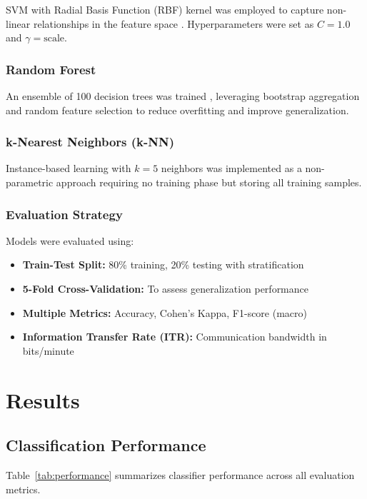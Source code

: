 \documentclass[11pt]{article}
\begin{document}
SVM with Radial Basis Function (RBF) kernel was employed to capture non-linear relationships in the feature space \citep{lotte2018review,pedregosa2011scikit}. Hyperparameters were set as $C=1.0$ and $\gamma=\text{scale}$.

\subsubsection{Random Forest}

An ensemble of 100 decision trees was trained \citep{pedregosa2011scikit}, leveraging bootstrap aggregation and random feature selection to reduce overfitting and improve generalization.

\subsubsection{k-Nearest Neighbors (k-NN)}

Instance-based learning with $k=5$ neighbors was implemented as a non-parametric approach requiring no training phase but storing all training samples.

\subsubsection{Evaluation Strategy}

Models were evaluated using:

\begin{itemize}
    \item \textbf{Train-Test Split:} 80\% training, 20\% testing with stratification
    \item \textbf{5-Fold Cross-Validation:} To assess generalization performance
    \item \textbf{Multiple Metrics:} Accuracy, Cohen's Kappa, F1-score (macro)
    \item \textbf{Information Transfer Rate (ITR):} Communication bandwidth in bits/minute
\end{itemize}

\section{Results}

\subsection{Classification Performance}

Table~\ref{tab:performance} summarizes classifier performance across all evaluation metrics.
\end{document}
